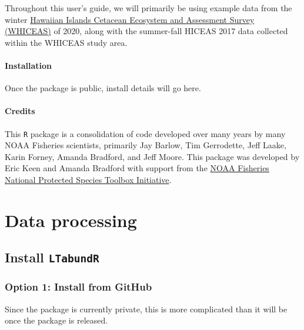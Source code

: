 \documentclass[
]{book}
\begin{document}
Throughout this user's guide, we will primarily be using example data from the winter \href{https://repository.library.noaa.gov/view/noaa/47788}{Hawaiian Islands Cetacean Ecosystem and Assessment Survey (WHICEAS)} of 2020, along with the summer-fall HICEAS 2017 data collected within the WHICEAS study area.

\hypertarget{installation}{%
\subsection*{Installation}\label{installation}}

Once the package is public, install details will go here.

\hypertarget{credits}{%
\subsection*{Credits}\label{credits}}

This \texttt{R} package is a consolidation of code developed over many years by many NOAA Fisheries scientists, primarily Jay Barlow, Tim Gerrodette, Jeff Laake, Karin Forney, Amanda Bradford, and Jeff Moore. This package was developed by Eric Keen and Amanda Bradford with support from the \href{https://www.fisheries.noaa.gov/national/population-assessments/national-protected-species-toolbox-initiative}{NOAA Fisheries National Protected Species Toolbox Initiative}.

\hypertarget{part-data-processing}{%
\part{Data processing}\label{part-data-processing}}

\hypertarget{install}{%
\chapter{\texorpdfstring{Install \texttt{LTabundR}}{Install LTabundR}}\label{install}}

\hypertarget{option-1-install-from-github}{%
\section*{Option 1: Install from GitHub}\label{option-1-install-from-github}}

Since the package is currently private, this is more complicated than it will be once the package is released.
\end{document}
